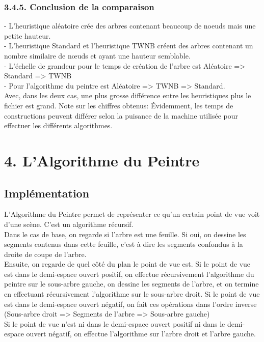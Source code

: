 \documentclass[a4paper,12pt]{report}	%
\begin{document}
    {\subsubsection*{3.4.5. Conclusion de la comparaison}}
     - L'heuristique aléatoire crée des arbres contenant beaucoup de noeuds mais une petite hauteur.\\
\indent - L'heuristique Standard et l'heuristique TWNB créent des arbres contenant un nombre similaire de nœuds et ayant une hauteur semblable. \\
\indent - L'échelle de grandeur pour le temps de création de l'arbre est Aléatoire => Standard => TWNB \\
\indent - Pour l'algorithme du peintre est Aléatoire => TWNB => Standard.\\
 Avec, dans les deux cas, une plus grosse différence entre les heuristiques plus le fichier est grand.
\indent Note sur les chiffres obtenus:
\indent Évidemment, les temps de constructions peuvent différer selon la puisance de la machine utilisée pour effectuer les différents algorithmes.
    
    \newpage
  
    {\section*{4. L'Algorithme du Peintre}}
    
    {\subsection*{Implémentation}}
    L'Algorithme du Peintre permet de représenter ce qu'un certain point de vue voit d'une scène. C'est un algorithme récursif.\\
    Dans le cas de base, on regarde si l'arbre est une feuille. Si oui, on dessine les segments contenus dans cette feuille, c'est à dire les segments confondus à la droite de coupe de l'arbre.\\
    Ensuite, on regarde de quel côté du plan le point de vue est. Si le point de vue est dans le demi-espace ouvert positif, on effectue récursivement l'algorithme du peintre sur le sous-arbre gauche, on dessine les segments de l'arbre, et on termine en effectuant récursivement l'algorithme sur le sous-arbre droit. Si le point de vue est dans le demi-espace ouvert négatif, on fait ces opérations dans l'ordre inverse (Sous-arbre droit => Segments de l'arbre => Sous-arbre gauche)\\
    Si le point de vue n'est ni dans le demi-espace ouvert positif ni dans le demi-espace ouvert négatif, on effectue l'algorithme sur l'arbre droit et l'arbre gauche.\\
    
\end{document}
